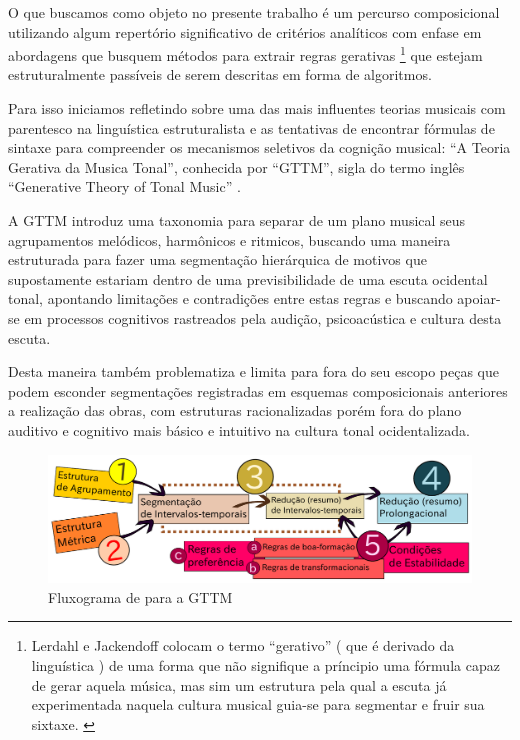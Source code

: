 \documentclass[
	12pt,				%
	openright,			%
	twoside,			%
	a4paper,			%
	english,			%
	french,				%
	spanish,			%
	brazil				%
	]{abntex2}
\begin{document}
O que buscamos como objeto no presente trabalho é um percurso composicional utilizando algum repertório significativo de critérios analíticos com enfase em abordagens que busquem métodos para extrair regras gerativas
\footnote{
Lerdahl e Jackendoff colocam o termo “gerativo” ( que é derivado da linguística ) de uma forma que não signifique a príncipio uma fórmula capaz de gerar aquela música, mas sim um estrutura pela qual a escuta já experimentada naquela cultura musical guia-se para segmentar e fruir sua sixtaxe. \cite[ p.6]{lerdahl1983generative}
}
que estejam estruturalmente passíveis de serem descritas em forma de algoritmos. 

Para isso iniciamos refletindo sobre uma das mais influentes teorias musicais com parentesco na linguística estruturalista e as tentativas de encontrar fórmulas de sintaxe para compreender os mecanismos seletivos da cognição musical: “A Teoria Gerativa da Musica Tonal”, conhecida por “GTTM”, sigla do termo inglês “Generative Theory of Tonal Music” \cite{lerdahl1983generative}.

A GTTM introduz uma taxonomia para separar de um plano musical seus agrupamentos melódicos, harmônicos e ritmicos, buscando uma maneira estruturada para fazer uma segmentação hierárquica de motivos que supostamente estariam dentro de uma previsibilidade de uma escuta ocidental tonal, apontando limitações e contradições entre estas regras e buscando apoiar-se em processos cognitivos rastreados pela audição, psicoacústica e cultura desta escuta. 

Desta maneira também problematiza e limita para fora do seu escopo peças que podem esconder segmentações registradas em esquemas composicionais anteriores a realização das obras, com estruturas racionalizadas porém fora do plano auditivo e cognitivo mais básico e intuitivo na cultura tonal ocidentalizada. 


\begin{figure}[!h]
	\caption{\label{fig_grafico}Fluxograma de  para a GTTM}
	\begin{center}
	    \includegraphics[scale=0.5]{gttm/GTTM_rules.pdf}
	\end{center}
\end{figure}
\end{document}
